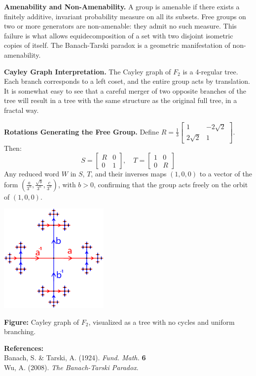\begin{technical}
\columnbreak

\textbf{Amenability and Non-Amenability.}  
A group is amenable if there exists a finitely additive, invariant probability measure on all its subsets. Free groups on two or more generators are non-amenable: they admit no such measure. This failure is what allows equidecomposition of a set with two disjoint isometric copies of itself. The Banach-Tarski paradox is a geometric manifestation of non-amenability.

\textbf{Cayley Graph Interpretation.}  
The Cayley graph of \(F_2\) is a 4-regular tree. Each branch corresponds to a left coset, and the entire group acts by translation. It is somewhat easy to see that a careful merger of two opposite branches of the tree will result in a tree with the same structure as the original full tree, in a fractal way.

\textbf{Rotations Generating the Free Group.}  
Define $R = \frac{1}{3}\begin{bmatrix} 1 & -2\sqrt{2} \\ 2\sqrt{2} & 1 \end{bmatrix}$. Then:
\[
S = \begin{bmatrix} R & 0 \\ 0 & 1 \end{bmatrix}, \quad
T = \begin{bmatrix} 1 & 0 \\ 0 & R \end{bmatrix}
\]
Any reduced word \(W\) in \(S\), \(T\), and their inverses maps \((1,0,0)\) to a vector of the form \(\left( \frac{a}{3^n}, \frac{\sqrt{b}}{3^n}, \frac{c}{3^n} \right)\), with \(b > 0\), confirming that the group acts freely on the orbit of \((1,0,0)\).

\begin{center}
\includegraphics[width=0.4\textwidth]{01_BanachTarskiParadox/F2_Cayley_Graph_tp1.png}

\vspace{0.5em}
\small
\textbf{Figure:} Cayley graph of \(F_2\), visualized as a tree with no cycles and uniform branching.
\end{center}

\vspace{0.25em}
\textbf{References:}\\
{\footnotesize
Banach, S. \& Tarski, A. (1924). \textit{Fund. Math.} \textbf{6}\\
Wu, A. (2008). \textit{The Banach-Tarski Paradox}.
}
\end{technical}